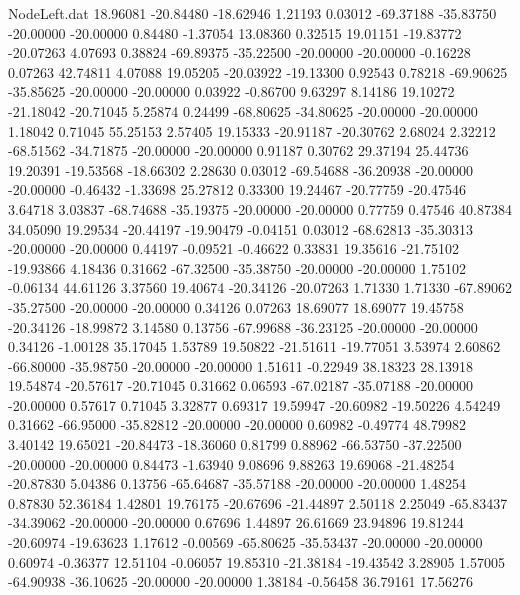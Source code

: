 \begin{filecontents}{NodeLeft.dat}
  18.96081  -20.84480  -18.62946     1.21193    0.03012  -69.37188  -35.83750  -20.00000  -20.00000    0.84480   -1.37054   13.08360    0.32515
  19.01151  -19.83772  -20.07263     4.07693    0.38824  -69.89375  -35.22500  -20.00000  -20.00000   -0.16228    0.07263   42.74811    4.07088
  19.05205  -20.03922  -19.13300     0.92543    0.78218  -69.90625  -35.85625  -20.00000  -20.00000    0.03922   -0.86700    9.63297    8.14186
  19.10272  -21.18042  -20.71045     5.25874    0.24499  -68.80625  -34.80625  -20.00000  -20.00000    1.18042    0.71045   55.25153    2.57405
  19.15333  -20.91187  -20.30762     2.68024    2.32212  -68.51562  -34.71875  -20.00000  -20.00000    0.91187    0.30762   29.37194   25.44736
  19.20391  -19.53568  -18.66302     2.28630    0.03012  -69.54688  -36.20938  -20.00000  -20.00000   -0.46432   -1.33698   25.27812    0.33300
  19.24467  -20.77759  -20.47546     3.64718    3.03837  -68.74688  -35.19375  -20.00000  -20.00000    0.77759    0.47546   40.87384   34.05090
  19.29534  -20.44197  -19.90479    -0.04151    0.03012  -68.62813  -35.30313  -20.00000  -20.00000    0.44197   -0.09521   -0.46622    0.33831
  19.35616  -21.75102  -19.93866     4.18436    0.31662  -67.32500  -35.38750  -20.00000  -20.00000    1.75102   -0.06134   44.61126    3.37560
  19.40674  -20.34126  -20.07263     1.71330    1.71330  -67.89062  -35.27500  -20.00000  -20.00000    0.34126    0.07263   18.69077   18.69077
  19.45758  -20.34126  -18.99872     3.14580    0.13756  -67.99688  -36.23125  -20.00000  -20.00000    0.34126   -1.00128   35.17045    1.53789
  19.50822  -21.51611  -19.77051     3.53974    2.60862  -66.80000  -35.98750  -20.00000  -20.00000    1.51611   -0.22949   38.18323   28.13918
  19.54874  -20.57617  -20.71045     0.31662    0.06593  -67.02187  -35.07188  -20.00000  -20.00000    0.57617    0.71045    3.32877    0.69317
  19.59947  -20.60982  -19.50226     4.54249    0.31662  -66.95000  -35.82812  -20.00000  -20.00000    0.60982   -0.49774   48.79982    3.40142
  19.65021  -20.84473  -18.36060     0.81799    0.88962  -66.53750  -37.22500  -20.00000  -20.00000    0.84473   -1.63940    9.08696    9.88263
  19.69068  -21.48254  -20.87830     5.04386    0.13756  -65.64687  -35.57188  -20.00000  -20.00000    1.48254    0.87830   52.36184    1.42801
  19.76175  -20.67696  -21.44897     2.50118    2.25049  -65.83437  -34.39062  -20.00000  -20.00000    0.67696    1.44897   26.61669   23.94896
  19.81244  -20.60974  -19.63623     1.17612   -0.00569  -65.80625  -35.53437  -20.00000  -20.00000    0.60974   -0.36377   12.51104   -0.06057
  19.85310  -21.38184  -19.43542     3.28905    1.57005  -64.90938  -36.10625  -20.00000  -20.00000    1.38184   -0.56458   36.79161   17.56276

\end{filecontents}

